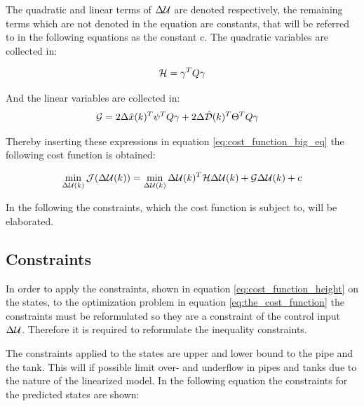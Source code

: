 The quadratic and linear terms of $\Delta \CMcal{U}$ are denoted respectively, the remaining terms which are not denoted in the equation are constants, that will be referred to in the following equations as the constant c. The quadratic variables are collected in: 

\begin{equation}\label{eq:quadratic_h_matrix}
	\CMcal{H} = \gamma^T Q\gamma 
\end{equation}

And the linear variables are collected in:
\begin{equation}
	\begin{aligned}
	\CMcal{G} &= 2 \Delta \hat{x}(k)^T\psi^T Q \gamma+2 \Delta \hat{\CMcal{D}}(k)^T\Theta^T Q \gamma 
	\end{aligned}
\end{equation}

Thereby inserting these expressions in equation \ref{eq:cost_function_big_eq} the following cost function is obtained:

\begin{equation}\label{eq:the_cost_function}
	\min_{\Delta \CMcal{U}(k)} \CMcal{J}(\Delta \CMcal{U}(k)) =\min_{\Delta \CMcal{U}(k)} \Delta \CMcal{U}(k)^T\CMcal{H}\Delta \CMcal{U}(k)+\CMcal{G}\Delta \CMcal{U}(k)+c
\end{equation}

In the following the constraints, which the cost function is subject to, will be elaborated. 

\subsection{Constraints}\label{subse:constraints}

In order to apply the constraints, shown in equation \ref{eq:cost_function_height} on the states, to the optimization problem in equation \ref{eq:the_cost_function} the constraints must be reformulated so they are a constraint of the control input $\Delta\CMcal{U}$. Therefore it is required to reformulate the inequality constraints. 

The constraints applied to the states are upper and lower bound to the pipe and the tank. 
This will if possible limit over- and underflow in pipes and tanks due to the nature of the linearized model.
In the following equation the constraints for the predicted states are shown:  


